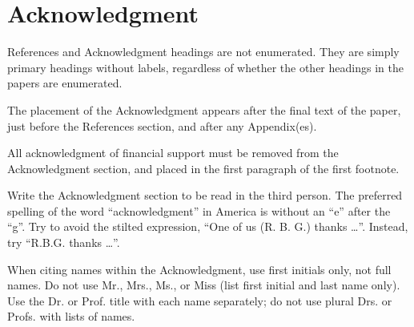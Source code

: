 \documentclass [a4paper,final,conference,10pt]{IDAACS}
\begin{document}
\section*{Acknowledgment}
References and Acknowledgment headings are not enumerated. They are simply 
primary headings without labels, regardless of whether the other headings 
in the papers are enumerated.

The placement of the Acknowledgment appears after the final text of the 
paper, just before the References section, and after any Appendix(es).

All acknowledgment of financial support must be removed from the 
Acknowledgment section, and placed in the first paragraph of the first 
footnote.

Write the Acknowledgment section to be read in the third person.
\enlargethispage{-7in}
The preferred spelling of the word ``acknowledgment'' in America 
is without an ``e'' after the ``g''. Try to avoid the stilted 
expression, ``One of us (R. B. G.) thanks \ldots''. Instead, 
try ``R.B.G. thanks \ldots{}''. 

When citing names within the Acknowledgment, use first initials 
only, not full names. Do not use Mr., Mrs., Ms., or Miss 
(list first initial and last name only). Use the Dr. or Prof. 
title with each name separately; do not use plural Drs. or 
Profs. with lists of names.




\end{document}

